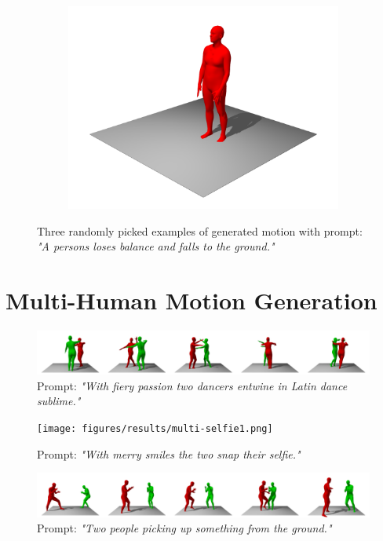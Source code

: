 \begin{figure}
\begin{subfigure}{0.32\linewidth}
        \includegraphics[width=\linewidth]{figures/results/single-falls3.png}
    \end{subfigure}
    \caption{Three randomly picked examples of generated motion with prompt: \textit{"A persons loses balance and falls to the ground."}}
\end{figure}

\section*{Multi-Human Motion Generation}

\begin{figure}
    \centering
    \includegraphics[width=\linewidth]{figures/results/multi-passion.png}
    \caption{Prompt: \textit{"With fiery passion two dancers entwine in Latin dance sublime."}}
\end{figure}


\begin{figure}
    \centering
    \texttt{[image: figures/results/multi-selfie1.png]}
    \caption{Prompt: \textit{"With merry smiles the two snap their selfie."}}
\end{figure}


\begin{figure}
    \centering
    \includegraphics[width=\linewidth]{figures/results/multi-pick-up.png}
    \caption{Prompt: \textit{"Two people picking up something from the ground."}}
\end{figure}